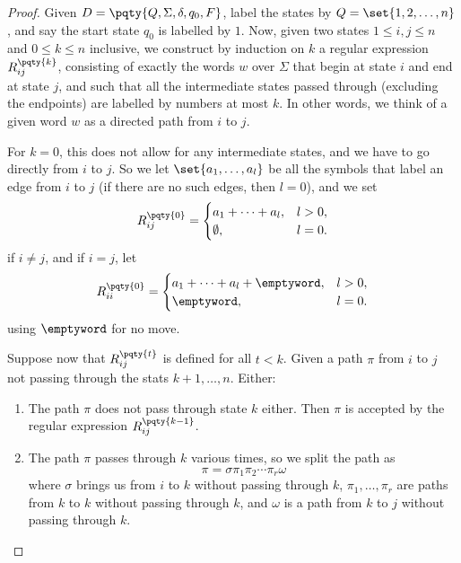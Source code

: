 \begin{proof}
    Given \(D = \pqty{Q, \Sigma, \delta, q_0, F}\), label the states by \(Q = \set{1, 2, \ldots, n}\), and say the start state \(q_0\) is labelled by \(1\). Now, given two states \(1 \leq i, j \leq n\) and \(0 \leq k \leq n\) inclusive, we construct by induction on \(k\) a regular expression \(R_{ij}^{\pqty{k}}\), consisting of exactly the words \(w\) over \(\Sigma\) that begin at state \(i\) and end at state \(j\), and such that all the intermediate states passed through (excluding the endpoints) are labelled by numbers at most \(k\). In other words, we think of a given word \(w\) as a directed path from \(i\) to \(j\).

    For \(k = 0\), this does not allow for any intermediate states, and we have to go directly from \(i\) to \(j\). So we let \(\set{a_1, \ldots, a_l}\) be all the symbols that label an edge from \(i\) to \(j\) (if there are no such edges, then \(l = 0\)), and we set
    \[
        R_{ij}^{\pqty{0}} = \begin{cases}
            a_1 + \cdots + a_l, & l > 0,\\
            \emptyset, & l = 0.
        \end{cases}
    \]
    if \(i \neq j\), and if \(i = j\), let 
    \[
        R_{ii}^{\pqty{0}} = \begin{cases}
            a_1 + \cdots + a_l + \emptyword, & l > 0,\\
            \emptyword, & l = 0.
        \end{cases}
    \]
    using \(\emptyword\) for no move.

    Suppose now that \(R_{ij}^{\pqty{t}}\) is defined for all \(t < k\). Given a path \(\pi\) from \(i\) to \(j\) not passing through the stats \(k + 1, \ldots, n\). Either:
    \begin{enumerate}
        \item The path \(\pi\) does not pass through state \(k\) either. Then \(\pi\) is accepted by the regular expression \(R_{ij}^{\pqty{k - 1}}\).
        \item The path \(\pi\) passes through \(k\) various times, so we split the path as
        \[
            \pi = \sigma \pi_1 \pi_2 \cdots \pi_r \omega
        \]
        where \(\sigma\) brings us from \(i\) to \(k\) without passing through \(k\), \(\pi_1, \ldots, \pi_r\) are paths from \(k\) to \(k\) without passing through \(k\), and \(\omega\) is a path from \(k\) to \(j\) without passing through \(k\).

        \begin{center}
\end{center}
\end{enumerate}
\end{proof}
